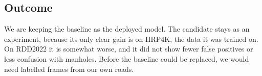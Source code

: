 \subsection{Outcome}
We are keeping the baseline as the deployed model. The candidate stays as an experiment, because its only clear gain is on HRP4K, the data it was trained on. On RDD2022 it is somewhat worse, and it did not show fewer false positives or less confusion with manholes. Before the baseline could be replaced, we would need labelled frames from our own roads.
